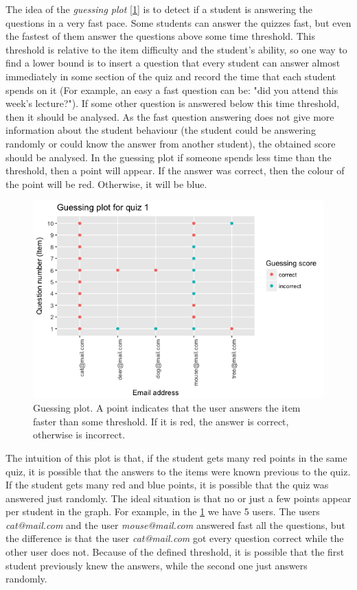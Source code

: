 The idea of the \textit{guessing plot} \cite{Stefan2015b} [\cref{img:group_guess}] is to detect if a student is answering the questions in a very fast pace. Some students can answer the quizzes fast, but even the fastest of them answer the questions above some time threshold. This threshold is relative to the item difficulty and the student's ability, so one way to find a lower bound is to insert a question that every student can answer almost immediately in some section of the quiz and record the time that each student spends on it (For example, an easy a fast question can be: "did you attend this week's lecture?"). If some other question is answered below this time threshold, then it should be analysed. As the fast question answering does not give more information about the student behaviour (the student could be answering randomly or could know the answer from another student), the obtained score should be analysed. In the guessing plot if someone spends less time than the threshold, then a point will appear. If the answer was correct, then the colour of the point will be red. Otherwise, it will be blue.

\begin{figure}[ht!]
  \centering
  \includegraphics[width=.9\linewidth]{img/group_guess.png}
  \caption{Guessing plot. A point indicates that the user answers the item faster than some threshold. If it is red, the answer is correct, otherwise is incorrect.}
  \label{img:group_guess}
\end{figure}

The intuition of this plot is that, if the student gets many red points in the same quiz, it is possible that the answers to the items were known previous to the quiz. If the student gets many red and blue points, it is possible that the quiz was answered just randomly. The ideal situation is that no or just a few points appear per student in the graph. For example, in the \cref{img:group_guess} we have 5 users. The users \textit{cat@mail.com} and the user \textit{mouse@mail.com} answered fast all the questions, but the difference is that the user \textit{cat@mail.com} got every question correct while the other user does not. Because of the defined threshold, it is possible that the first student previously knew the answers, while the second one just answers randomly.


